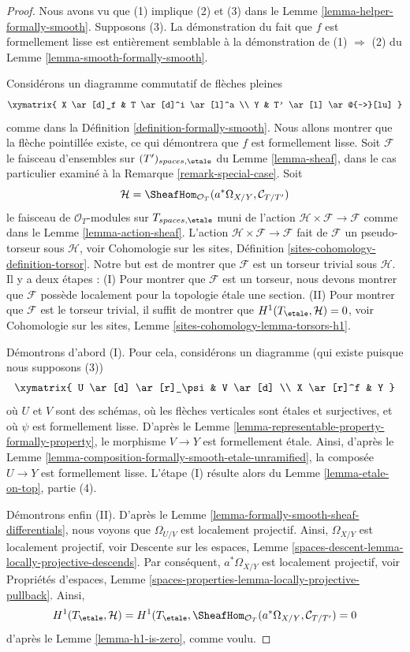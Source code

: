 \begin{proof}
Nous avons vu que (1) implique (2) et (3) dans le
Lemme \ref{lemma-helper-formally-smooth}.
Supposons (3).
La démonstration du fait que $f$ est formellement lisse est entièrement semblable à
la démonstration de (1) $\Rightarrow$ (2) du
Lemme \ref{lemma-smooth-formally-smooth}.

\medskip\noindent
Considérons un diagramme commutatif de flèches pleines
$$
\xymatrix{
X \ar[d]_f & T \ar[d]^i \ar[l]^a \\
Y & T' \ar[l] \ar@{-->}[lu]
}
$$
comme dans la Définition \ref{definition-formally-smooth}.
Nous allons montrer que la flèche pointillée existe, ce qui
démontrera que $f$ est formellement lisse.
Soit $\mathcal{F}$ le faisceau d'ensembles sur $(T')_{spaces, \etale}$ du
Lemme \ref{lemma-sheaf}, dans le cas particulier examiné à la
Remarque \ref{remark-special-case}.
Soit
$$
\mathcal{H} =
\SheafHom_{\mathcal{O}_T}(a^*\Omega_{X/Y}, \mathcal{C}_{T/T'})
$$
le faisceau de $\mathcal{O}_T$-modules sur $T_{spaces, \etale}$
muni de l'action $\mathcal{H} \times \mathcal{F} \to \mathcal{F}$ comme dans le
Lemme \ref{lemma-action-sheaf}.
L'action $\mathcal{H} \times \mathcal{F} \to \mathcal{F}$
fait de $\mathcal{F}$ un pseudo-torseur sous $\mathcal{H}$, voir
Cohomologie sur les sites, Définition \ref{sites-cohomology-definition-torsor}.
Notre but est de montrer que $\mathcal{F}$ est un torseur trivial sous $\mathcal{H}$.
Il y a deux étapes : (I) Pour montrer que $\mathcal{F}$ est un torseur,
nous devons montrer que $\mathcal{F}$ possède localement pour la topologie étale
une section. (II) Pour montrer que $\mathcal{F}$ est le torseur trivial,
il suffit de montrer que $H^1(T_\etale, \mathcal{H}) = 0$, voir
Cohomologie sur les sites, Lemme \ref{sites-cohomology-lemma-torsors-h1}.

\medskip\noindent
Démontrons d'abord (I). Pour cela, considérons un diagramme
(qui existe puisque nous supposons (3))
$$
\xymatrix{
U \ar[d] \ar[r]_\psi & V \ar[d] \\
X \ar[r]^f & Y
}
$$
où $U$ et $V$ sont des schémas, où les flèches verticales sont étales et
surjectives, et où $\psi$ est formellement lisse. D'après le
Lemme \ref{lemma-representable-property-formally-property},
le morphisme $V \to Y$ est formellement étale. Ainsi, d'après le
Lemme \ref{lemma-composition-formally-smooth-etale-unramified},
la composée $U \to Y$ est formellement lisse. L'étape (I) résulte alors du
Lemme \ref{lemma-etale-on-top}, partie (4).

\medskip\noindent
Démontrons enfin (II). D'après le
Lemme \ref{lemma-formally-smooth-sheaf-differentials},
nous voyons que $\Omega_{U/V}$ est localement projectif.
Ainsi, $\Omega_{X/Y}$ est localement projectif, voir
Descente sur les espaces,
Lemme \ref{spaces-descent-lemma-locally-projective-descends}.
Par conséquent, $a^*\Omega_{X/Y}$ est localement projectif, voir
Propriétés d'espaces, Lemme
\ref{spaces-properties-lemma-locally-projective-pullback}.
Ainsi,
$$
H^1(T_\etale, \mathcal{H}) =
H^1(T_\etale,
\SheafHom_{\mathcal{O}_T}(a^*\Omega_{X/Y}, \mathcal{C}_{T/T'}) = 0
$$
d'après le
Lemme \ref{lemma-h1-is-zero},
comme voulu.
\end{proof}

